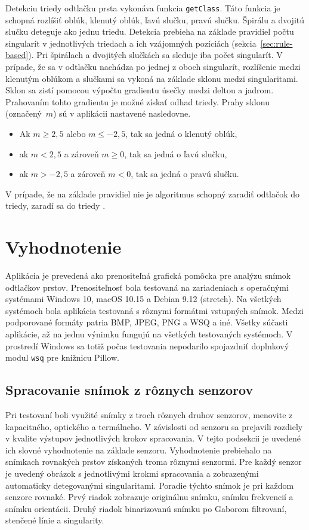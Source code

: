   Detekciu triedy odtlačku prsta vykonáva funkcia \texttt{getClass}. Táto funkcia je schopná rozlíšiť oblúk, klenutý oblúk, ľavú slučku, pravú slučku.
  Špirálu a dvojitú slučku deteguje ako jednu triedu. Detekcia prebieha na základe pravidiel počtu singularít v jednotlivých triedach a ich vzájomných
  pozíciách (sekcia~{\ref{sec:rule-based}}). Pri špirálach a dvojitých slučkách sa sleduje iba počet singularít. V prípade, že sa
  v odtlačku nachádza po jednej z oboch singularít, rozlíšenie medzi klenutým oblúkom a slučkami sa vykoná na základe sklonu medzi singularitami. Sklon sa
  zistí pomocou výpočtu gradientu úsečky medzi deltou a jadrom. Prahovaním tohto gradientu je možné získať odhad triedy. Prahy sklonu (označený~{$m$})
  sú v aplikácii nastavené nasledovne.
  \begin{itemize}
    \item Ak $m \geq 2,5$ alebo $m \leq -2,5$, tak sa jedná o klenutý oblúk,
    \item ak $m < 2,5$ a zároveň $m \geq 0$, tak sa jedná o ľavú slučku,
    \item ak $m > -2,5$ a zároveň $m < 0$, tak sa jedná o pravú slučku.
  \end{itemize}
  V prípade, že na základe pravidiel nie je algoritmus schopný zaradiť odtlačok do triedy, zaradí sa do triedy .

\chapter{Vyhodnotenie}
  Aplikácia je prevedená ako prenositeľná grafická pomôcka pre analýzu snímok odtlačkov prstov. Prenositeľnosť bola testovaná na zariadeniach s operačnými
  systémami Windows 10, macOS 10.15 a Debian 9.12 (stretch). Na všetkých systémoch bola aplikácia testovaná s rôznymi formátmi vstupných snímok. Medzi
  podporované formáty patria BMP, JPEG, PNG a WSQ a iné. Všetky súčasti aplikácie, až na jednu výnimku fungujú na všetkých testovaných systémoch. V prostredí
  Windows sa totiž počas testovania nepodarilo spojazdniť doplnkový modul \texttt{wsq} pre knižnicu Pillow.

  \section{Spracovanie snímok z rôznych senzorov}
  Pri testovaní boli využité snímky z troch rôznych druhov senzorov, menovite z kapacitného, optického a termálneho. V závislosti od senzoru sa prejavili
  rozdiely v kvalite výstupov jednotlivých krokov spracovania. V tejto podsekcii je uvedené ich slovné vyhodnotenie na základe senzoru.
  Vyhodnotenie prebiehalo na snímkach rovnakých prstov získaných troma rôznymi senzormi. Pre každý senzor je uvedený obrázok s jednotlivými krokmi spracovania
  a zobrazenými automaticky detegovanými singularitami. Poradie týchto snímok je pri každom senzore rovnaké. Prvý riadok zobrazuje originálnu snímku, snímku
  frekvencií a snímku orientácii. Druhý riadok binarizovanú snímku po Gaborom filtrovaní, stenčené línie a singularity.

